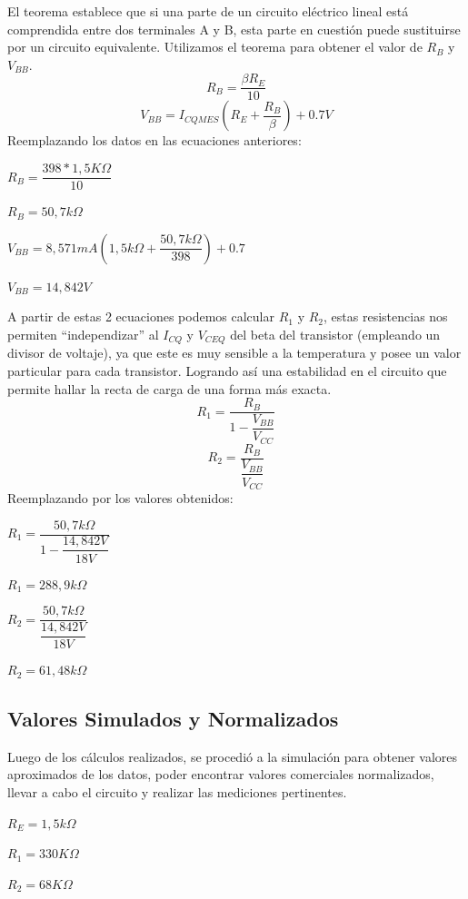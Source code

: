 \documentclass[12pt]{article}
\begin{document}
El teorema establece que si una parte de un circuito eléctrico lineal está comprendida entre dos terminales A y B, esta parte en cuestión puede sustituirse por un circuito equivalente.
Utilizamos el teorema para obtener el valor de $R_B$ y $V_{BB}$.
\begin{equation}
 R_B=\dfrac{\beta R_E}{10}
\end{equation}
\begin{equation}
 V_{BB}=I_{CQMES}(R_E+\dfrac{R_B}{\beta})+0.7V
\end{equation}
Reemplazando los datos en las ecuaciones anteriores:
\begin{center}
$R_B=\dfrac{398*1,5K\Omega}{10}$

$R_B=50,7k\Omega$

\vspace{0.8 cm}
$V_{BB}=8,571mA(1,5k\Omega+\dfrac{50,7k\Omega}{398})+0.7$

$V_{BB}=14,842V$
\end{center}
\vspace{1 cm}
A partir de estas 2 ecuaciones podemos calcular $R_1$ y $R_2$,  estas resistencias nos permiten “independizar” al $I_{CQ}$ y $V_{CEQ}$ del beta del transistor (empleando un divisor de voltaje), ya que este es muy sensible a la temperatura y posee un valor particular para cada transistor. Logrando así una estabilidad en el circuito que permite hallar la recta de carga de una forma más exacta.
\begin{equation}
\label{R1}
 R_1=\frac{R_B}{1-\dfrac{V_{BB}}{V_{CC}}}
\end{equation}
\begin{equation}
\label{R2}
 R_2=\frac{R_B}{\dfrac{V_{BB}}{V_{CC}}}
\end{equation}
\vspace{0.5cm}
Reemplazando por los valores obtenidos:
\begin{center}
 
$R_1=\dfrac{50,7k\Omega}{1-\dfrac{14,842V}{18V}}$

$R_1=288,9k\Omega$

\vspace{0.8 cm}
$R_2=\dfrac{50,7k\Omega}{\dfrac{14,842V}{18V}}$

$R_2=61,48k\Omega$
\end{center}


\subsection{Valores Simulados y Normalizados}
Luego de los cálculos realizados, se procedió a la simulación para obtener valores aproximados de los datos, poder encontrar valores comerciales normalizados, llevar a cabo el circuito y realizar las mediciones pertinentes.
\begin{center}
 $R_E=1,5k\Omega$

 $R_1=330K\Omega$
 
 $R_2=68K\Omega$

 \end{center}
\end{document}
